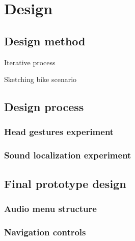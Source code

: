 \chapter{Design}

\section{Design method}
Iterative process

Sketching bike scenario

\section{Design process}

\subsection{Head gestures experiment}

\subsection{Sound localization experiment}


\section{Final prototype design}

\subsection{Audio menu structure}



\subsection{Navigation controls}








